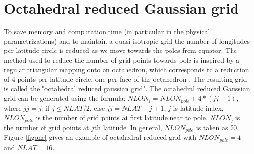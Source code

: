 \documentclass{SBCbookchapter}
\begin{document}
\section{Octahedral reduced Gaussian grid}
To save memory and computation time (in particular in the physical parametrizations) and to maintain a quasi-isotropic grid the number of longitudes per latitude circle is reduced as we move towards the poles from equator. 
The method used to reduce the number of grid points towards pole is inspired by a regular triangular mapping onto an octahedron, which corresponds to a reduction of 4 points per latitude circle, one per face of the octahedron \cite{malardel_new_2016}. The resulting grid is called the "octahedral reduced gaussian grid". The octahedral reduced Gaussian grid can be generated using the formula: $NLON_j = NLON_{pole} + 4*(jj-1)$, where $jj=j$, if $j \leq NLAT/2$, else $jj=NLAT-j+1$, $j$ is latitude index, $NLON_{pole}$ is the number of grid points at first latitude near to pole, $NLON_j$ is the number of grid points at $j$th latitude. In general, $NLON_{pole}$ is taken as 20. Figure \ref{figone} gives an example of octahedral reduced grid with $NLON_{pole} = 4$ and $NLAT=16$.
\end{document}
